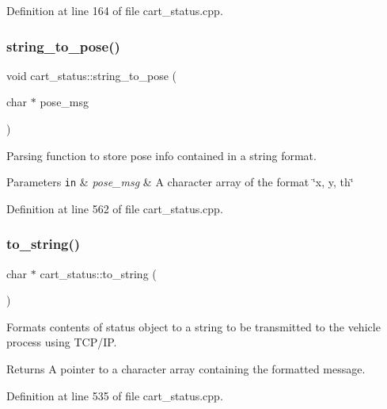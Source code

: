 Definition at line 164 of file cart\+\_\+status.\+cpp.

\mbox{\label{classcart__status_acacf14bfb0b1be8f32b7bf133facbfa1}} 
\subsubsection{\texorpdfstring{string\+\_\+to\+\_\+pose()}{string\_to\_pose()}}
{\footnotesize\ttfamily void cart\+\_\+status\+::string\+\_\+to\+\_\+pose (\begin{DoxyParamCaption}\item[{char $\ast$}]{pose\+\_\+msg }\end{DoxyParamCaption})}

Parsing function to store pose info contained in a string format. 
\begin{DoxyParams}[1]{Parameters}
\mbox{\tt in}  & {\em pose\+\_\+msg} & A character array of the format \char`\"{}x, y, th\char`\"{} \\
\hline
\end{DoxyParams}


Definition at line 562 of file cart\+\_\+status.\+cpp.

\mbox{\label{classcart__status_a555321d8af00245d5d53ec52876e54e7}} 
\subsubsection{\texorpdfstring{to\+\_\+string()}{to\_string()}}
{\footnotesize\ttfamily char $\ast$ cart\+\_\+status\+::to\+\_\+string (\begin{DoxyParamCaption}{ }\end{DoxyParamCaption})}

Formats contents of status object to a string to be transmitted to the vehicle process using T\+C\+P/\+IP. \begin{DoxyReturn}{Returns}
A pointer to a character array containing the formatted message. 
\end{DoxyReturn}


Definition at line 535 of file cart\+\_\+status.\+cpp.

